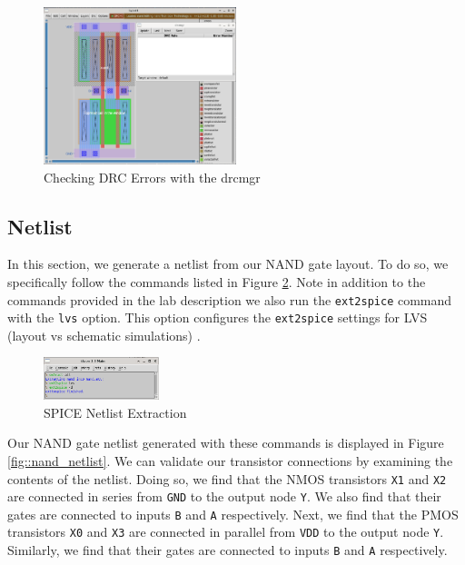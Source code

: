 \documentclass{article}
\begin{document}
	\begin{figure}[H]
		\centerline{\includegraphics[width=0.5\textwidth]{nand_drc_errors_drcmgr.png}}
		\caption{Checking DRC Errors with the drcmgr}
		\label{fig::nand_drc_errors_drcmgr}
	\end{figure}
	
	\subsection{Netlist}
	
	In this section, we generate a netlist from our NAND gate layout. To do so, we specifically follow the commands listed in Figure \ref{fig::nand_netlist_creation}. Note in addition to the commands provided in the lab description we also run the \texttt{ext2spice} command with the \texttt{lvs} option. This option configures the \texttt{ext2spice} settings for LVS (layout vs schematic simulations) \cite{a2021_magic83}.
	
	\begin{figure}[H]
		\centerline{\includegraphics[width=0.3\textwidth]{nand_netlist_creation.png}}
		\caption{SPICE Netlist Extraction}
		\label{fig::nand_netlist_creation}
	\end{figure}
	
	Our NAND gate netlist generated with these commands is displayed in Figure \ref{fig::nand_netlist}. We can validate our transistor connections by examining the contents of the netlist. Doing so, we find that the NMOS transistors \texttt{X1} and \texttt{X2} are connected in series from \texttt{GND} to the output node \texttt{Y}. We also find that their gates are connected to inputs \texttt{B} and \texttt{A} respectively. Next, we find that the PMOS transistors \texttt{X0} and \texttt{X3} are connected in parallel from \texttt{VDD} to the output node \texttt{Y}. Similarly, we find that their gates are connected to inputs \texttt{B} and \texttt{A} respectively.
	
\end{document}
